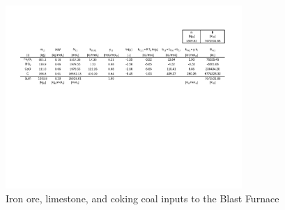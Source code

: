 \documentclass[energies,article,submit,pdftex,moreauthors]{Definitions/mdpi}
\begin{document}
\begin{figure}[h!]
  \centering
  \includegraphics[width=0.8\textwidth]{images/Solid BF Inputs.pdf}
  \caption{Iron ore, limestone, and coking coal inputs to the Blast Furnace}
  \label{fig:Solid Blast Furnace Inputs}
\end{figure}
\end{document}
